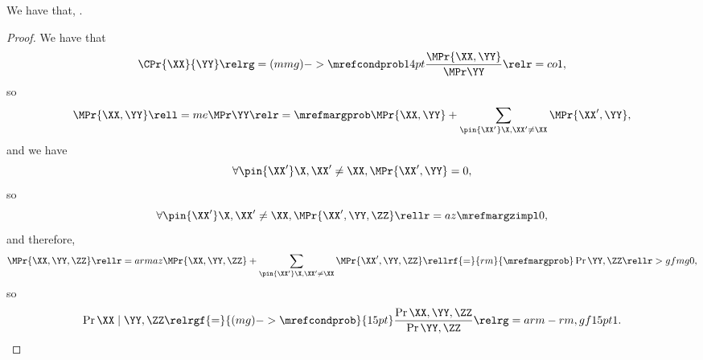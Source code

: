 \begin{proposition}
  \nrp
  We have that, \ponecindprop.%
\end{proposition}

\begin{proof}
  \nrp
  We have that 
  $$\CPr{\XX}{\YY} \relrg = (mmg)->{\mrefcondprob} 14pt \frac{\MPr{\XX, \YY}}{\MPr\YY} \relr = co 1,$$
  \nrp
  so 
  \def\notx{\pin{\XX'}\X, \XX' \ne \XX}
  $$\MPr{\XX, \YY} \rell = me \MPr\YY \relr = {\mrefmargprob} \MPr{\XX, \YY} + \sum_{\notx}\MPr{\XX', \YY},$$
  \nrp
  and we have
  $$\forall \notx, \MPr{\XX',\YY} = 0,$$
  \nrp
  so
  $$\forall \notx, \MPr{\XX',\YY,\ZZ} \rellr = az {\mrefmargzimpl} 0,$$
  \nrp
  and therefore, $$\MPr{\XX,\YY,\ZZ} \rellr = arm az \MPr{\XX,\YY,\ZZ} + \sum_{\notx}\MPr{\XX',\YY,\ZZ}
  \rellrf{=}{rm}{\mrefmargprob} \Pr{\YY, \ZZ} \rellr > gf mg 0,$$
  \nrp
  so $$\Pr{\XX \mid \YY, \ZZ} 
  \relrgf{=}{(mg)->\mrefcondprob}{15pt} \frac{\Pr{\XX, \YY, \ZZ}}{\Pr{\YY, \ZZ}} 
  \relrg = arm-rm,gf 15pt 1.$$%
\end{proof}
